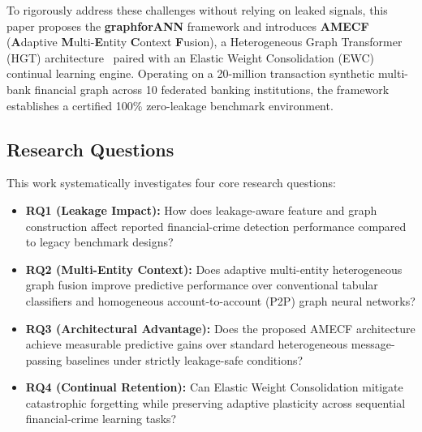 To rigorously address these challenges without relying on leaked signals, this paper proposes the \textbf{graphforANN} framework and introduces \textbf{AMECF} (\textbf{A}daptive \textbf{M}ulti-\textbf{E}ntity \textbf{C}ontext \textbf{F}usion), a Heterogeneous Graph Transformer (HGT) architecture~\cite{hu2020heterogeneous} paired with an Elastic Weight Consolidation (EWC)~\cite{kirkpatrick2017overcoming} continual learning engine. Operating on a 20-million transaction synthetic multi-bank financial graph across 10 federated banking institutions, the framework establishes a certified 100\% zero-leakage benchmark environment.

\subsection{Research Questions}
This work systematically investigates four core research questions:
\begin{itemize}
    \item \textbf{RQ1 (Leakage Impact):} How does leakage-aware feature and graph construction affect reported financial-crime detection performance compared to legacy benchmark designs?
    \item \textbf{RQ2 (Multi-Entity Context):} Does adaptive multi-entity heterogeneous graph fusion improve predictive performance over conventional tabular classifiers and homogeneous account-to-account (P2P) graph neural networks?
    \item \textbf{RQ3 (Architectural Advantage):} Does the proposed AMECF architecture achieve measurable predictive gains over standard heterogeneous message-passing baselines under strictly leakage-safe conditions?
    \item \textbf{RQ4 (Continual Retention):} Can Elastic Weight Consolidation mitigate catastrophic forgetting while preserving adaptive plasticity across sequential financial-crime learning tasks?
\end{itemize}

